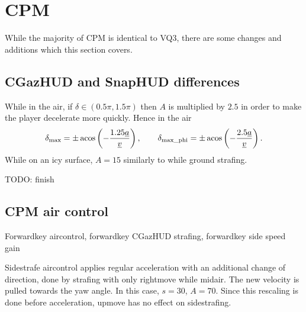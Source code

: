 \section{CPM}
\label{sec:cpm}

While the majority of CPM is identical to VQ3, there are some changes and additions which this section covers.

\subsection{CGazHUD and SnapHUD differences}
\label{sec:cgaz_snap_CPM}
While in the air, if $\delta \in (0.5\pi, 1.5\pi)$ then $A$ is multiplied by $2.5$ in order to make the player decelerate more quickly.
Hence in the air
\begin{align*}
\delta_{\max} = \pm\acos\left(-\frac{1.25\flat{a}}{\flat{v}} \right),\qquad \delta_{\maxphi} = \pm\acos\left(-\frac{2.5\flat{a}}{\flat{v}} \right).
\end{align*}
While on an icy surface, $A = 15$ similarly to while ground strafing.

TODO: finish


\subsection{CPM air control}
\label{sec:turn_CPM}
Forwardkey aircontrol, forwardkey CGazHUD strafing, forwardkey side speed gain

Sidestrafe aircontrol applies regular acceleration with an additional change of direction, done by strafing with only rightmove while midair. The new velocity is pulled towards the yaw angle.
In this case, $s = 30$, $A = 70$.
Since this rescaling is done before acceleration, upmove has no effect on sidestrafing.

